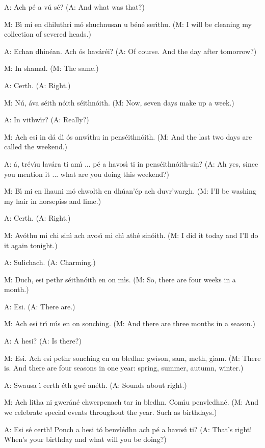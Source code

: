 A: Ach p\'{e} a v\'{u} s\'{e}?
(A: And what was that?)

M: B\'{\i} mi en dhiluthri m\'{o} shuchnusan u b\'{e}n\'{e} ser\'{\i}thu.
(M: I will be cleaning my collection of severed heads.)

A: Echan dhin\'{e}an. Ach \'{o}s hav\'{a}r\'{e}i?
(A: Of course. And the day after tomorrow?)

M: In shamal.
(M: The same.)

A: Certh.
(A: Right.)

M: N\'{u}, \'{a}va s\'{e}ith n\'{o}ith s\'{e}ithn\'{o}ith.
(M: Now, seven days make up a week.)

A: In vithw\'{\i}r?
(A: Really?)

M: Ach esi in d\'{a} d\'{\i} \'{o}s anw\'{\i}thu in pens\'{e}ithn\'{o}ith.
(M: And the last two days are called the weekend.)

A: \'{a}, tr\'{e}v\'{\i}u lav\'{a}ra ti am\'{\i} ... p\'{e} a havos\'{\i} ti in pens\'{e}ithn\'{o}ith-sin?
(A: Ah yes, since you mention it ... what are you doing this weekend?)

M: B\'{\i} mi en lhauni m\'{o} chwolth en dh\'{u}an'\'{e}p ach duvr'wargh.
(M: I’ll be washing my hair in horsepiss and lime.)

A: Certh.
(A: Right.)

M: Av\'{o}thu mi chi sin\'{\i} ach avos\'{\i} mi ch\'{\i} ath\'{e} sin\'{o}ith.
(M: I did it today and I’ll do it again tonight.)

A: Sulichach.
(A: Charming.)

M: Duch, esi pethr s\'{e}ithn\'{o}ith en on m\'{\i}s.
(M: So, there are four weeks in a month.)

A: Esi.
(A: There are.)

M: Ach esi tr\'{\i} m\'{\i}s en on sonching.
(M: And there are three months in a season.)

A: A hesi?
(A: Is there?)

M: Esi. Ach esi pethr sonching en on bledhn: gw\'{\i}son, sam, meth, g\'{\i}am.
(M: There is. And there are four seasons in one year: spring, summer, autumn, winter.)

A: Swausa \'{\i} certh \'{e}th gw\'{e} an\'{e}th.
(A: Sounds about right.)

M: Ach litha ni gwer\'{a}n\'{e} chwerpenach tar in bledhn. Com\'{\i}u penvledhn\'{e}.
(M: And we celebrate special events throughout the year. Such as birthdays.)

A: Esi s\'{e} certh! Ponch a hesi t\'{o} benvl\'{e}dhn ach p\'{e} a havos\'{\i} ti?
(A: That’s right! When’s your birthday and what will you be doing?)

